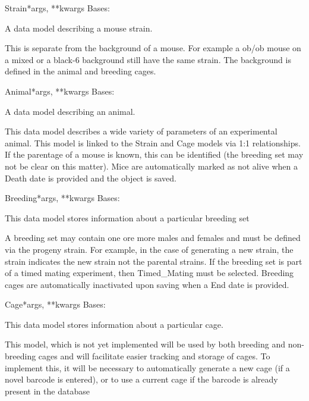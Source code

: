 \documentclass[letterpaper,10pt,english]{sphinxmanual}
\begin{document}
\hypertarget{animal.models.Strain}{}\begin{classdesc}{Strain}{*args, **kwargs}
Bases: 

A data model describing a mouse strain.

This is separate from the background of a mouse.  For example a ob/ob mouse on a mixed or a black-6 background still have the same strain.  The background is defined in the animal and breeding cages.
\end{classdesc}

\hypertarget{animal.models.Animal}{}\begin{classdesc}{Animal}{*args, **kwargs}
Bases: 

A data model describing an animal.

This data model describes a wide variety of parameters of an experimental animal.  This model is linked to the Strain and Cage models via 1:1 relationships.  If the parentage of a mouse is known, this can be identified (the breeding set may not be clear on this matter). Mice are automatically marked as not alive when a Death date is provided and the object is saved.
\end{classdesc}

\hypertarget{animal.models.Breeding}{}\begin{classdesc}{Breeding}{*args, **kwargs}
Bases: 

This data model stores information about a particular breeding set

A breeding set may contain one ore more males and females and must be defined via the progeny strain.  For example, in the case of generating a new strain, the strain indicates the new strain not the parental strains.  If the breeding set is part of a timed mating experiment, then Timed\_Mating must be selected.  Breeding cages are automatically inactivated upon saving when a End date is provided.
\end{classdesc}

\hypertarget{animal.models.Cage}{}\begin{classdesc}{Cage}{*args, **kwargs}
Bases: 

This data model stores information about a particular cage.

This model, which is not yet implemented will be used by both breeding and non-breeding cages and will facilitate easier tracking and storage of cages.  To implement this, it will be necessary to automatically generate a new cage (if a novel barcode is entered), or to use a current cage if the barcode is already present in the database
\end{classdesc}
\end{document}
